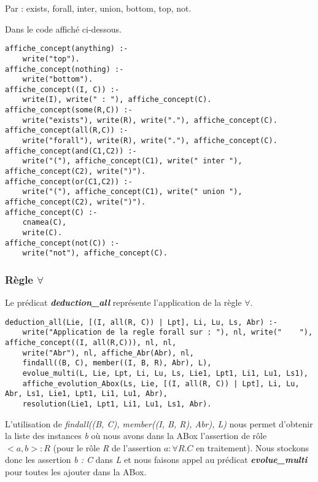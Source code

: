 \documentclass{rapportECL}
\begin{document}
Par : exists, forall, inter, union, bottom, top, not.

Dans le code affiché ci-dessous.

\begin{lstlisting}[style=prologStyle, caption={Affichage d'une liste d'assertion}, label={AffichageConcept}]
affiche_concept(anything) :-
    write("top").
affiche_concept(nothing) :- 
    write("bottom").
affiche_concept((I, C)) :-
    write(I), write(" : "), affiche_concept(C).
affiche_concept(some(R,C)) :-
    write("exists"), write(R), write("."), affiche_concept(C).
affiche_concept(all(R,C)) :-
    write("forall"), write(R), write("."), affiche_concept(C).
affiche_concept(and(C1,C2)) :-
    write("("), affiche_concept(C1), write(" inter "), affiche_concept(C2), write(")").
affiche_concept(or(C1,C2)) :-
    write("("), affiche_concept(C1), write(" union "), affiche_concept(C2), write(")").
affiche_concept(C) :-
    cnamea(C),
    write(C).
affiche_concept(not(C)) :-
    write("not"), affiche_concept(C).
\end{lstlisting}

\newpage

\subsubsection{Règle \(\forall\)}

Le prédicat \textbf{\textit{deduction\_all}} représente l'application de la règle \(\forall\).

\begin{lstlisting}[style=prologStyle, caption={Application de la regle \(\forall\)}, label={forall}]
deduction_all(Lie, [(I, all(R, C)) | Lpt], Li, Lu, Ls, Abr) :- 
    write("Application de la regle forall sur : "), nl, write("    "), affiche_concept((I, all(R,C))), nl, nl,
    write("Abr"), nl, affiche_Abr(Abr), nl,
    findall((B, C), member((I, B, R), Abr), L),
    evolue_multi(L, Lie, Lpt, Li, Lu, Ls, Lie1, Lpt1, Li1, Lu1, Ls1),
    affiche_evolution_Abox(Ls, Lie, [(I, all(R, C)) | Lpt], Li, Lu, Abr, Ls1, Lie1, Lpt1, Li1, Lu1, Abr),
    resolution(Lie1, Lpt1, Li1, Lu1, Ls1, Abr).
\end{lstlisting}

L'utilisation de \textit{findall((B, C), member((I, B, R), Abr), L)} nous permet d'obtenir la liste des instances \textit{b} où nous avons dans la ABox l'assertion de rôle \textit{\( <a,b> : R \)} (pour le rôle \textit{R} de l'assertion \textit{\( a : \forall R.C \)} en traitement). Nous stockons donc les assertion \textit{ b : C } dans \textit{L} et nous faisons appel au prédicat \textbf{\textit{evolue\_multi}} pour toutes les ajouter dans la ABox.
\end{document}
